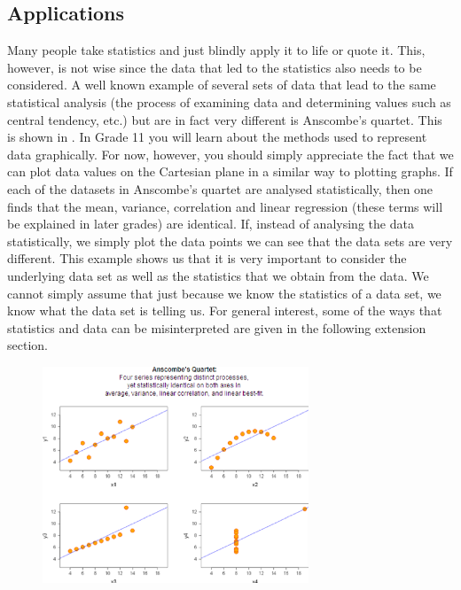 \begin{description}[noitemsep]
\begin{description}[noitemsep]
            \section{ Applications}
            \nopagebreak
            \label{m39404*eip-493}Many people take statistics and just blindly apply it to life or quote it. This, however, is not wise since the data that led to the statistics also needs to be considered. A well known example of several sets of data that lead to the same statistical analysis (the process of examining data and determining values such as central tendency, etc.) but are in fact very different is Anscombe's quartet. This is shown in . In Grade 11 you will learn about the methods used to represent data graphically. For now, however, you should simply appreciate the fact that we can plot data values on the Cartesian plane in a similar way to plotting graphs. If each of the datasets in Anscombe's quartet are analysed statistically, then one finds that the mean, variance, correlation and linear regression (these terms will be explained in later grades) are identical. If, instead of analysing the data statistically, we simply plot the data points we can see that the data sets are very different. This example shows us that it is very important to consider the underlying data set as well as the statistics that we obtain from the data. We cannot simply assume that just because we know the statistics of a data set, we know what the data set is telling us. For general interest, some of the ways that statistics and data can be misinterpreted are given in the following extension section.   
    \setcounter{subfigure}{0}
	\begin{figure}[H] %
    \begin{center}
    \label{m39404*uid3453!!!underscore!!!media}\label{m39404*uid3453!!!underscore!!!printimage}\includegraphics[width=300px]{col11306.imgs/m39404_anscombe.png} %

\end{center}
\end{figure}
\end{description}
\end{description}
